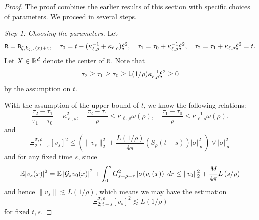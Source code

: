 \begin{proof}
The proof combines the earlier results of this section with specific choices of
parameters. We proceed in several steps.

\medskip
\noindent\textit{Step 1: Choosing the parameters.}
Let
\begin{equation*}
\mathtt{R}=\mathtt{B}_{\xi,k_{\xi,z}(x)+z},\quad
\tau_0=t-(\kappa_{\ell,\rho}^{-1}+\kappa_{\ell,\rho})\xi^2,
\quad
\tau_1=\tau_0+\kappa_{\ell,\rho}^{-1}\xi^2,
\quad
\tau_2=\tau_1+\kappa_{\ell,\rho}\xi^2=t.
\end{equation*}
Let $X\in\mathbb{R}^d$ denote the center of $\mathtt{R}$. Note that
\begin{equation*}
\tau_2\geq\tau_1\geq\tau_0
\geq\mathsf{L}(1/\rho)\kappa_{\ell,\rho}^{-1}\xi^2\geq0
\end{equation*}
by the assumption on $t$.\par
With the assumption of the upper bound of $t$, we know the following relations:
\[
\dfrac{\tau_2-\tau_1}{\tau_1-\tau_0} = \kappa_{\ell,\rho}^2,\quad \dfrac{\tau_2-\tau_1}{\rho} \leq {\kappa_{\ell,\rho}}\omega(\rho),\quad \dfrac{\tau_1-\tau_0}{\rho} \leq \kappa_{\ell,\rho}^{-1}\omega(\rho).
\]
and
\[
\Xi_{2;t-s}^{\sigma,\rho}[v_s]^2 \leq \left(\lVert v_s\rVert_2^2 + \dfrac{L(1/\rho)}{4\pi}(S_{\rho}(t-s))|\sigma|_{\infty}^2\right) \vee |\sigma|_{\infty}^2
\]
and for any fixed time $s$, since
\[
\mathbb{E} |v_s(x)|^2 = \mathbb{E} \left|\mathcal{G}_{s}v_0(x)\right|^2 + \int_0^s G_{s+\rho-r}^2\left|\sigma(v_r(x))\right|dr \leq \lVert v_0\rVert_2^2 + \dfrac{M}{4\pi}L\left(s/\rho\right)
\]
and hence $\lVert v_s\rVert \lesssim L(1/\rho)$, which means we may have the estimation
\[
\Xi_{2;t-s}^{\sigma,\rho}[v_s]^2 \lesssim L(1/\rho)
\]
for fixed $t,s$.


\end{proof}

